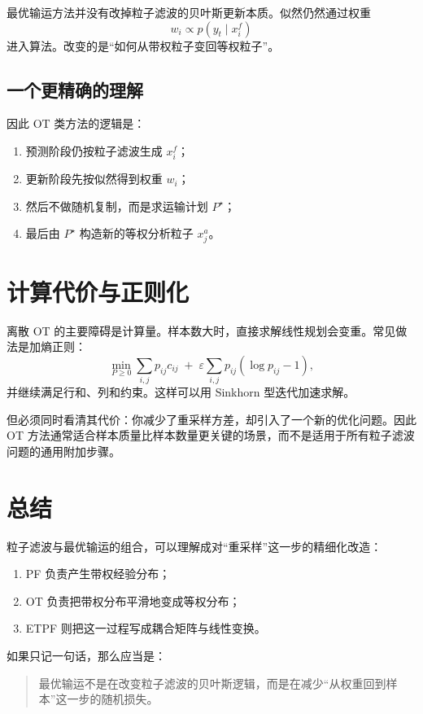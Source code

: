 \documentclass[12pt,a4paper]{ctexart}
\begin{document}
最优输运方法并没有改掉粒子滤波的贝叶斯更新本质。似然仍然通过权重
\[
w_i \propto p(y_t \mid x_i^f)
\]
进入算法。改变的是“如何从带权粒子变回等权粒子”。

\subsection{一个更精确的理解}

因此 OT 类方法的逻辑是：
\begin{enumerate}
  \item 预测阶段仍按粒子滤波生成 \(x_i^f\)；
  \item 更新阶段先按似然得到权重 \(w_i\)；
  \item 然后不做随机复制，而是求运输计划 \(P^\star\)；
  \item 最后由 \(P^\star\) 构造新的等权分析粒子 \(x_j^a\)。
\end{enumerate}

\section{计算代价与正则化}

离散 OT 的主要障碍是计算量。样本数大时，直接求解线性规划会变重。常见做法是加熵正则：
\[
\min_{P \ge 0}
\sum_{i,j} p_{ij} c_{ij}
\;+\;
\varepsilon \sum_{i,j} p_{ij}(\log p_{ij} - 1),
\]
并继续满足行和、列和约束。这样可以用 Sinkhorn 型迭代加速求解。

但必须同时看清其代价：你减少了重采样方差，却引入了一个新的优化问题。因此 OT 方法通常适合样本质量比样本数量更关键的场景，而不是适用于所有粒子滤波问题的通用附加步骤。

\section{总结}

粒子滤波与最优输运的组合，可以理解成对“重采样”这一步的精细化改造：
\begin{enumerate}
  \item PF 负责产生带权经验分布；
  \item OT 负责把带权分布平滑地变成等权分布；
  \item ETPF 则把这一过程写成耦合矩阵与线性变换。
\end{enumerate}

如果只记一句话，那么应当是：
\begin{quote}
最优输运不是在改变粒子滤波的贝叶斯逻辑，而是在减少“从权重回到样本”这一步的随机损失。
\end{quote}
\end{document}
